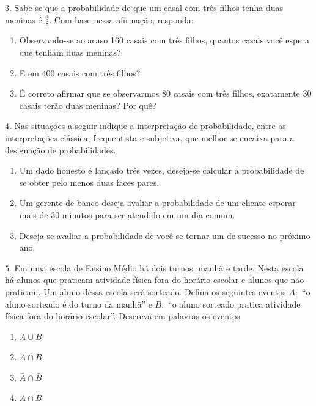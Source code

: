 \(3.\) Sabe-se que a probabilidade de que um casal com três filhos tenha duas meninas é \(\frac{3}{8}\). Com base nessa afirmação, responda:
\begin{enumerate}
\item {} 
Observando-se ao acaso 160 casais com três filhos, quantos casais você espera que tenham duas meninas?

\item {} 
E em 400 casais com três filhos?

\item {} 
É correto afirmar que se observarmos 80 casais com três filhos, exatamente 30 casais terão duas meninas? Por quê?

\end{enumerate}

\(4.\) Nas situações a seguir indique a interpretação de probabilidade, entre as interpretações clássica, frequentista e subjetiva, que melhor se encaixa para a designação de probabilidades.
\begin{enumerate}
\item {} 
Um dado honesto é lançado três vezes, deseja-se calcular a probabilidade de se obter pelo menos duas faces pares.

\item {} 
Um gerente de banco deseja avaliar a probabilidade de um cliente esperar mais de 30 minutos para ser atendido em um dia comum.

\item {} 
Deseja-se avaliar a probabilidade de você se tornar um  de sucesso no próximo ano.

\end{enumerate}

\(5.\) Em uma escola de Ensino Médio há dois turnos: manhã e tarde. Nesta escola há alunos que praticam atividade física fora do horário escolar e alunos que não praticam. Um aluno dessa escola será sorteado. Defina os seguintes eventos \(A:\) “o aluno sorteado é do turno da manhã” e \(B:\) “o aluno sorteado pratica atividade física fora do horário escolar”. Descreva em palavras os eventos
\begin{enumerate}
\item {} 
\(A\cup B\)

\item {} 
\(A\cap B\)

\item {} 
\(\bar{A}\cap \bar{B}\)

\item {} 
\(\overline{A\cap B}\)

\end{enumerate}

